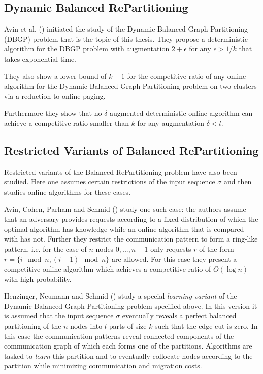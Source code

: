 \documentclass[a4paper, 10pt]{article}
\newcommand{\opt}{\text{O{\scriptsize PT}}}
\theoremstyle{definition}
\begin{document}
	
	\subsection{Dynamic Balanced RePartitioning}
	Avin et al. (\cite{Avin2015}) initiated the study of the Dynamic Balanced Graph Partitioning (DBGP) problem that is the topic of this thesis. They propose a deterministic algorithm for the DBGP problem with augmentation $2+\epsilon$ for any $\epsilon>1/k$ that takes exponential time. 
	
	They also show a lower bound of $k-1$ for the competitive ratio of any online algorithm for the Dynamic Balanced Graph Partitioning problem on two clusters via a reduction to online paging. 
	
	Furthermore they show that no $\delta$-augmented deterministic online algorithm can achieve a competitive ratio smaller than $k$ for any augmentation $\delta<l$.	
	
	\subsection{Restricted Variants of Balanced RePartitioning}
	Restricted variants of the Balanced RePartitioning problem have also been studied. Here one assumes certain restrictions of the input sequence $\sigma$ and then studies online algorithms for these cases. 
	
	Avin, Cohen, Parham and Schmid (\cite{Avin2018}) study one such case: the authors assume that an adversary provides requests according to a fixed distribution of which the optimal algorithm \opt{} has knowledge while an online algorithm that is compared with \opt{} has not. Further they restrict the communication pattern to form a ring-like pattern, i.e. for the case of $n$ nodes $0,...,n-1$ only requests $r$ of the form $r=\{i \mod n, (i+1)\mod n\}$ are allowed. For this case they present a competitive online algorithm which achieves a competitive ratio of $O(\log n)$ with high probability.	
	
	Henzinger, Neumann and Schmid (\cite{Henzinger2019}) study a special \textit{learning variant} of the Dynamic Balanced Graph Partitioning problem specified above. In this version it is assumed that the input sequence $\sigma$ eventually reveals a perfect balanced partitioning of the $n$ nodes into $l$ parts of size $k$ such that the edge cut is zero. In this case the communication patterns reveal connected components of the communication graph of which each forms one of the partitions. Algorithms are tasked to \textit{learn} this partition and to eventually collocate nodes according to the partition while minimizing communication and migration costs.
	
\end{document}
